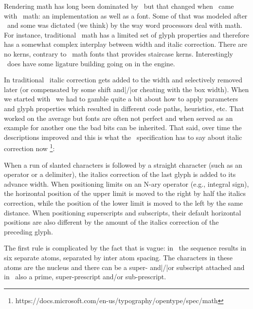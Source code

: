 \stopsection

\startsection[title=Setting up the engine]

Rendering math has long been dominated by \TEX\ but that changed when \MICROSOFT\
came with \OPENTYPE\ math: an implementation as well as a font. Some of that was
modeled after \TEX\ and some was dictated (we think) by the way word processors
deal with math. For instance, traditional \TEX\ math has a limited set of glyph
properties and therefore has a somewhat complex interplay between width and
italic correction. There are no kerns, contrary to \OPENTYPE\ math fonts that
provides staircase kerns. Interestingly \TEX\ does have some ligature building
going on in the engine.

In traditional \TEX\ italic correction gets added to the width and selectively
removed later (or compensated by some shift and|/|or cheating with the box
width). When we started with \LUATEX\ we had to gamble quite a bit about how to
apply parameters and glyph properties which resulted in different code paths,
heuristics, etc. That worked on the average but fonts are often not perfect and
when served as an example for another one the bad bits can be inherited. That
said, over time the descriptions improved and this is what the \OPENTYPE\
specification has to say about italic correction now \footnote {\type
{https://docs.microsoft.com/en-us/typography/opentype/spec/math}}:

\startitemize [n]
    \startitem
        When a run of slanted characters is followed by a straight character
        (such as an operator or a delimiter), the italics correction of the last
        glyph is added to its advance width.
    \stopitem
    \startitem
        When positioning limits on an N-ary operator (e.g., integral sign), the
        horizontal position of the upper limit is moved to the right by half the
        italics correction, while the position of the lower limit is moved to the
        left by the same distance.
    \stopitem
    \startitem
        When positioning superscripts and subscripts, their default horizontal
        positions are also different by the amount of the italics correction of
        the preceding glyph.
    \stopitem
\stopitemize

The first rule is complicated by the fact that  is vague: in
\TEX\ the sequence  results in six separate atoms, separated
by inter atom spacing. The characters in these atoms are the nucleus and there
can be a super- and|/|or subscript attached and in \LUAMETATEX\ also a prime,
super-prescript and/or sub-prescript.


